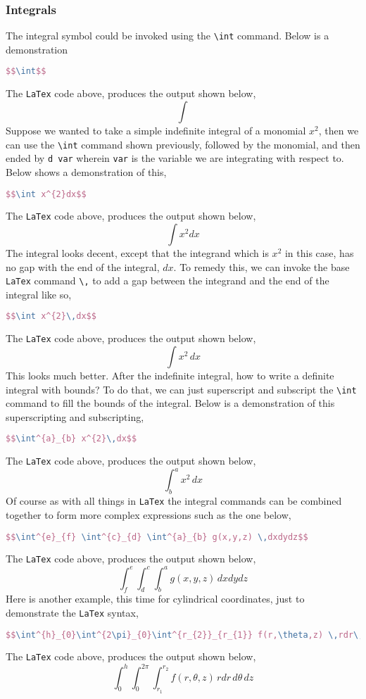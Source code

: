 \documentclass[a4paper, 12pt]{report}
\begin{document}
\begin{center}
\subsubsection{Integrals}
\begin{comment}
\end{comment}
The integral symbol could be invoked using the \texttt{\textbackslash int} command. Below is a demonstration
\begin{lstlisting}[language=tex]
$$\int$$
\end{lstlisting}
The \texttt{LaTex} code above, produces the output shown below,
$$\int$$
Suppose we wanted to take a simple indefinite integral of a monomial $x^{2}$, then we can use the \texttt{\textbackslash int} command shown previously, followed by the monomial, and then ended by \texttt{d var} wherein \texttt{var} is the variable we are integrating with respect to. Below shows a demonstration of this,
\begin{lstlisting}[language=tex]
$$\int x^{2}dx$$
\end{lstlisting}
The \texttt{LaTex} code above, produces the output shown below,
$$\int x^{2}dx$$
The integral looks decent, except that the integrand which is $x^{2}$ in this case, has no gap with the end of the integral, $dx$. To remedy this, we can invoke the base \texttt{LaTex} command \texttt{\textbackslash ,} to add a gap between the integrand and the end of the integral like so,
\begin{lstlisting}[language=tex]
$$\int x^{2}\,dx$$
\end{lstlisting}
The \texttt{LaTex} code above, produces the output shown below,
$$\int x^{2}\,dx$$
This looks much better. After the indefinite integral, how to write a definite integral with bounds? To do that, we can just superscript and subscript the \texttt{\textbackslash int} command to fill the bounds of the integral. Below is a demonstration of this superscripting and subscripting,
\begin{lstlisting}[language=tex]
$$\int^{a}_{b} x^{2}\,dx$$
\end{lstlisting}
The \texttt{LaTex} code above, produces the output shown below,
$$\int^{a}_{b} x^{2}\,dx$$
Of course as with all things in \texttt{LaTex} the integral commands can be combined together to form more complex expressions such as the one below,
\begin{lstlisting}[language=tex]
$$\int^{e}_{f} \int^{c}_{d} \int^{a}_{b} g(x,y,z) \,dxdydz$$
\end{lstlisting}
The \texttt{LaTex} code above, produces the output shown below,
$$\int^{e}_{f} \int^{c}_{d} \int^{a}_{b} g(x,y,z) \,dxdydz$$
Here is another example, this time for cylindrical coordinates, just to demonstrate the \texttt{LaTex} syntax,
\begin{lstlisting}[language=tex]
$$\int^{h}_{0}\int^{2\pi}_{0}\int^{r_{2}}_{r_{1}} f(r,\theta,z) \,rdr\,d\theta\,dz$$
\end{lstlisting}
The \texttt{LaTex} code above, produces the output shown below,
$$\int^{h}_{0}\int^{2\pi}_{0}\int^{r_{2}}_{r_{1}} f(r,\theta,z) \,rdr\,d\theta\,dz$$


\end{center}
\end{document}
